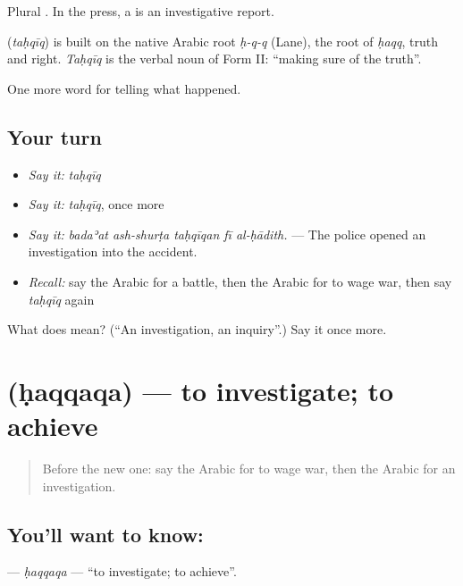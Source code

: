 Plural . In the press, a  is an investigative report.

\begin{cousinweb}
\textbf{} (\emph{taḥqīq}) is built on the native Arabic root \emph{ḥ-q-q} (Lane), the root of \emph{ḥaqq}, truth and right. \emph{Taḥqīq} is the verbal noun of Form II: \textquotedblleft{}making sure of the truth\textquotedblright{}.
\end{cousinweb}

\begin{grammarlens}[title={What you've built}]
One more word for telling what happened.
\end{grammarlens}

\subsection*{Your turn}
\begin{itemize}
\raggedright
  \item \emph{Say it:} \emph{taḥqīq}
  \item \emph{Say it:} \emph{taḥqīq}, once more
  \item \emph{Say it:} \emph{badaʾat ash-shurṭa taḥqīqan fī al-ḥādith.} — The police opened an investigation into the accident.
  \item \emph{Recall:} say the Arabic for a battle, then the Arabic for to wage war, then say \emph{taḥqīq} again
\end{itemize}

\begin{tcolorbox}[breakable,colback=teal!4,colframe=teal!35!black,title={Before you move on}]
What does  mean? (\textquotedblleft{}An investigation, an inquiry\textquotedblright{}.) Say it once more.
\end{tcolorbox}
\section[\texorpdfstring{\ar{حقق} (ḥaqqaqa)}{حقق (ḥaqqaqa)}]{ (ḥaqqaqa) — to investigate; to achieve}

\label{lesson:AR-C308-haqqaqa}



\begin{quote}
Before the new one: say the Arabic for to wage war, then the Arabic for an investigation.
\end{quote}

\subsection*{You'll want to know: }
\textbf{} — \emph{ḥaqqaqa} — \textquotedblleft{}to investigate; to achieve\textquotedblright{}.

